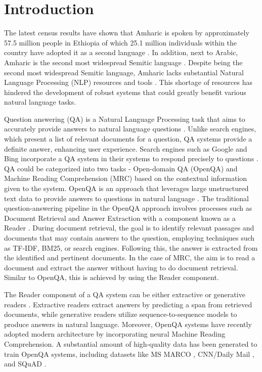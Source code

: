 \section{Introduction}
The latest census results have shown that Amharic is spoken by approximately 57.5 million people in Ethiopia of which 25.1 million individuals within the country have adopted it as a second language \cite{hirpassa2023improving}. In addition, next to Arabic, Amharic is the second most widespread Semitic language \cite{hirpassa2023improving}. Despite being the second most widespread Semitic language, Amharic lacks substantial Natural Language Processing (NLP) resources and tools \cite{basha2023detection}. This shortage of resources has hindered the development of robust systems that could greatly benefit various natural language tasks.  

Question answering (QA) is a Natural Language Processing task that aims to accurately provide answers  to natural language questions \cite{zhu2021retrieving}. Unlike search engines, which present a list of relevant documents for a question, QA systems provide a definite answer, enhancing user experience. Search engines such as Google and Bing incorporate a QA system in their systems to respond precisely to questions \cite{zhu2021retrieving}.   
QA could be categorized into two tasks - Open-domain QA (OpenQA) and Machine Reading Comprehension (MRC) based on the contextual information given to the system. OpenQA is an approach that leverages large unstructured text data to provide answers to questions in natural language \cite{zhu2021retrieving}. The traditional question-answering pipeline in the OpenQA approach involves processes such as Document Retrieval and Answer Extraction with a component known as a Reader \cite{zhu2021retrieving}. During document retrieval, the goal is to identify relevant passages and documents that may contain answers to the question, employing techniques such as TF-IDF, BM25, or search engines. Following this, the answer is extracted from the identified and pertinent documents.  In the case of MRC, the aim is to read a document and extract the answer without having to do document retrieval. Similar to OpenQA, this is achieved by using the Reader component.  

The Reader component of a QA system can be either extractive or generative readers \cite{zhu2021retrieving}. Extractive readers extract answers by predicting a span from retrieved documents, while generative readers utilize sequence-to-sequence models to produce answers in natural language. Moreover, OpenQA systems have recently adopted modern architecture by incorporating neural Machine Reading Comprehension. A substantial amount of high-quality data has been generated to train OpenQA systems, including datasets like MS MARCO \cite{nguyen2016ms}, CNN/Daily Mail \cite{hermann2015teaching}, and SQuAD \cite{rajpurkar2018know}.

